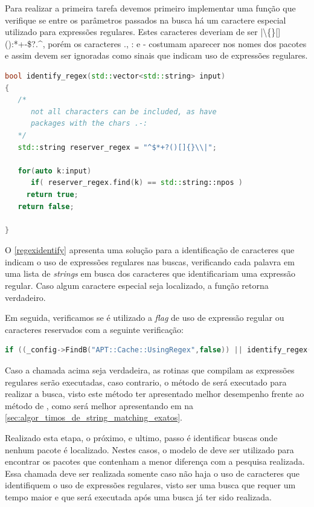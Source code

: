 Para realizar a primeira tarefa devemos primeiro implementar uma função que verifique se entre os parâmetros passados na busca há um caractere especial utilizado para expressões regulares. Estes caracteres deveriam de ser {\code |\textbackslash\{\}[]():*+-\$?.\^{}}, porém os caracteres {\code .}, {\code :} e {\code -} costumam aparecer nos nomes dos pacotes e assim devem ser ignoradas como sinais que indicam uso de expressões regulares.

\begin{lstlisting}[language=C++,label=regexidentify,caption={Identificação de Expressões Regulares}]
bool identify_regex(std::vector<std::string> input)
{
   /*
      not all characters can be included, as have
      packages with the chars .-:
   */
   std::string reserver_regex = "^$*+?()[]{}\\|";

   for(auto k:input)
      if( reserver_regex.find(k) == std::string::npos )
	 return true;
   return false;

}
\end{lstlisting}

O \autoref{regexidentify} apresenta uma solução para a identificação de caracteres que indicam o uso de expressões regulares nas buscas, verificando cada palavra em uma lista de \textit{strings} em busca dos caracteres que identificariam uma expressão regular. Caso algum caractere especial seja localizado, a função retorna verdadeiro.


Em seguida, verificamos se é utilizado a \textit{flag} de uso de expressão regular ou caracteres reservados com a seguinte verificação:

\begin{lstlisting}[language=C++,basicstyle=\footnotesize\ttfamily,numbers=none]
if ((_config->FindB("APT::Cache::UsingRegex",false)) || identify_regex(args))
\end{lstlisting}

Caso a chamada acima seja verdadeira, as rotinas que compilam as expressões regulares serão executadas, caso contrario, o método de  será executado para realizar a busca, visto este método ter apresentado melhor desempenho frente ao método de , como será melhor apresentando em  na \autoref{sec:algor_timos_de_string_matching_exatos}.


Realizado esta etapa, o próximo, e ultimo, passo é identificar buscas onde nenhum pacote é localizado. Nestes casos, o modelo de \textit{} deve ser utilizado para encontrar os pacotes que contenham a menor diferença com a pesquisa realizada. Essa chamada deve ser realizada somente caso não haja o uso de caracteres que identifiquem o uso de expressões regulares, visto ser uma busca que requer um tempo maior e que será executada após uma busca já ter sido realizada.

